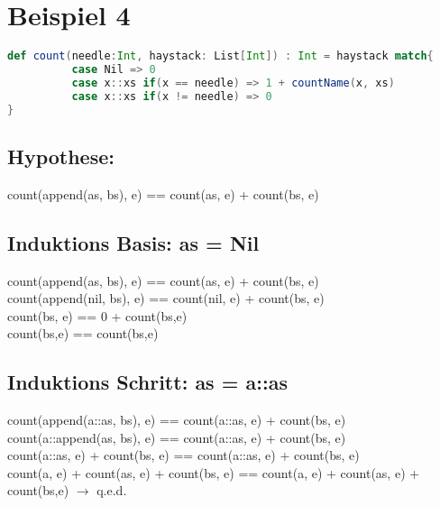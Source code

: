 \documentclass[12pt,runningheads,a4paper]{llncs}
\begin{document}
\section*{Beispiel 4}
\begin{lstlisting}[language=scala]
    def count(needle:Int, haystack: List[Int]) : Int = haystack match{
          case Nil => 0
          case x::xs if(x == needle) => 1 + countName(x, xs)
          case x::xs if(x != needle) => 0
} 
\end{lstlisting}

\subsection*{Hypothese:}
count(append(as, bs), e) == count(as, e) + count(bs, e)
\subsection*{Induktions Basis:   as = Nil}
count(append(as, bs), e) == count(as, e) + count(bs, e)\\
count(append(nil, bs), e) == count(nil, e) + count(bs, e)\\
count(bs, e) == 0 + count(bs,e)\\
count(bs,e) == count(bs,e)


\subsection*{Induktions Schritt:   as = a::as}
count(append(a::as, bs), e) == count(a::as, e) + count(bs, e)\\
count(a::append(as, bs), e) == count(a::as, e) + count(bs, e)\\
count(a::as, e) + count(bs, e) == count(a::as, e) + count(bs, e)\\ 
count(a, e) + count(as, e) + count(bs, e) == count(a, e) + count(as, e) + count(bs,e) $\rightarrow$ q.e.d.
\end{document}
